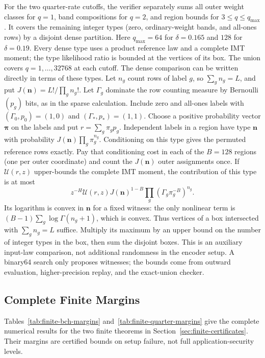 For the two quarter-rate cutoffs, the verifier separately sums all outer
weight classes for $q=1$, band compositions for $q=2$, and region bounds
for $3\le q\le q_{\max}$. It covers the remaining integer types
(zero, ordinary-weight bands, and all-ones rows) by a disjoint dense partition.
Here $q_{\max}=64$ for $\delta=0.165$ and $128$ for $\delta=0.19$.
Every dense type uses a product reference law and a complete IMT moment;
the type likelihood ratio is bounded at the vertices of its box.
The union covers $q=1,\ldots,32768$ at each cutoff.
The dense comparison can be written directly in terms of these types. Let $n_g$ count rows of label $g$, so $\sum_g n_g=L$,
and put $J(\boldsymbol n)=L!/\prod_g n_g!$.
Let $\Gamma_g$ dominate the row counting measure by Bernoulli$(p_g)$
bits, as in the sparse calculation. Include zero and all-ones labels with
$(\Gamma_0,p_0)=(1,0)$ and $(\Gamma_*,p_*)=(1,1)$.
Choose a positive probability vector $\boldsymbol\pi$ on the labels and
put $r=\sum_g\pi_gp_g$. Independent labels in a region have type
$\boldsymbol n$ with probability $J(\boldsymbol n)\prod_g\pi_g^{n_g}$.
Conditioning on this type gives the permuted reference rows exactly.
Pay that conditioning cost in each of the $B=128$ regions (one per outer coordinate) and count
the $J(\boldsymbol n)$ outer assignments once. If $\mathcal U(r,z)$
upper-bounds the complete IMT moment, the contribution of this type is at most
\[
 z^{-H}\mathcal U(r,z)J(\boldsymbol n)^{1-B}
       \prod_g(\Gamma_g\pi_g^{-B})^{n_g}.
\]
Its logarithm is convex in $\boldsymbol n$ for a fixed witness: the only
nonlinear term is $(B-1)\sum_g\log\Gamma(n_g+1)$, which is convex.
Thus vertices of a box intersected with $\sum_g n_g=L$ suffice.
Multiply its maximum by an upper bound on the number of integer types in
the box, then sum the disjoint boxes. This is an auxiliary input-law
comparison, not additional randomness in the encoder setup.
A binary64 search only proposes witnesses; the bounds come from outward
evaluation, higher-precision replay, and the exact-union checker.

\subsection{Complete Finite Margins}
\label{app:finite-margin-tables}

Tables~\ref{tab:finite-bch-margins} and~\ref{tab:finite-quarter-margins}
give the complete numerical results for the two finite theorems in
Section~\ref{sec:finite-certificates}. Their margins are certified bounds
on setup failure, not full application-security levels.

